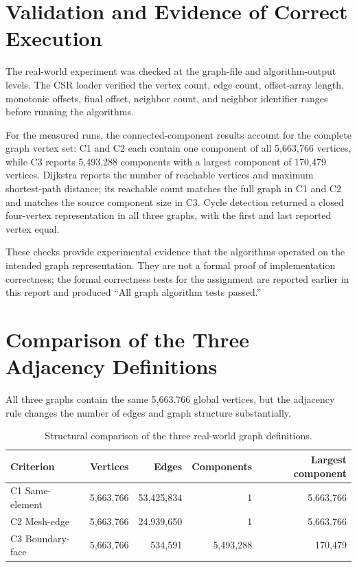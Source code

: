 \documentclass[11pt]{article}
\begin{document}
\section{Validation and Evidence of Correct Execution}
The real-world experiment was checked at the graph-file and algorithm-output levels. The CSR loader verified the vertex count, edge count, offset-array length, monotonic offsets, final offset, neighbor count, and neighbor identifier ranges before running the algorithms.

For the measured runs, the connected-component results account for the complete graph vertex set: C1 and C2 each contain one component of all 5,663,766 vertices, while C3 reports 5,493,288 components with a largest component of 170,479 vertices. Dijkstra reports the number of reachable vertices and maximum shortest-path distance; its reachable count matches the full graph in C1 and C2 and matches the source component size in C3. Cycle detection returned a closed four-vertex representation in all three graphs, with the first and last reported vertex equal.

These checks provide experimental evidence that the algorithms operated on the intended graph representation. They are not a formal proof of implementation correctness; the formal correctness tests for the assignment are reported earlier in this report and produced ``All graph algorithm tests passed.''

\section{Comparison of the Three Adjacency Definitions}
All three graphs contain the same 5,663,766 global vertices, but the adjacency rule changes the number of edges and graph structure substantially.

\begin{table}[H]
\centering
\caption{Structural comparison of the three real-world graph definitions.}
\label{tab:bonus-comparison}
\small
\begin{tabular}{lrrrr}
\toprule
Criterion & Vertices & Edges & Components & Largest component\\
\midrule
C1 Same-element & 5,663,766 & 53,425,834 & 1 & 5,663,766\\
C2 Mesh-edge & 5,663,766 & 24,939,650 & 1 & 5,663,766\\
C3 Boundary-face & 5,663,766 & 534,591 & 5,493,288 & 170,479\\
\bottomrule
\end{tabular}
\end{table}
\end{document}
